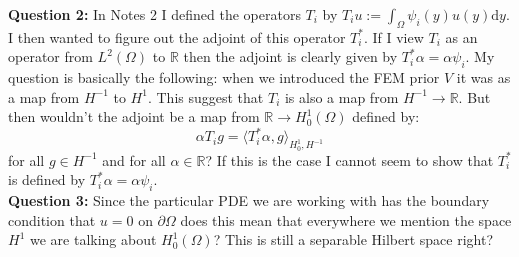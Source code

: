 \documentclass{article}
\theoremstyle{definition}
\theoremstyle{remark}
\begin{document}
\noindent \textbf{Question 2:} In Notes 2 I defined the operators $T_{i}$ by $T_{i}u:=\int_{\Omega}\psi_{i}(y)u(y)\mathrm{d}y$. I then wanted to figure out the adjoint of this operator $T_{i}^{*}$. If I view $T_{i}$ as an operator from $L^{2}(\Omega)$ to $\mathbb{R}$ then the adjoint is clearly given by $T_{i}^{*}\alpha=\alpha \psi_{i}$. My question is basically the following: when we introduced the FEM prior $V$ it was as a map from $H^{-1}$ to $H^{1}$. This suggest that $T_{i}$ is also a map from $H^{-1}\rightarrow\mathbb{R}$. But then wouldn't the adjoint be a map from $\mathbb{R}\rightarrow H_{0}^{1}(\Omega)$ defined by:
\begin{equation*}
    \alpha T_{i}g=\langle T_{i}^{*}\alpha, g \rangle_{H_{0}^{1},H^{-1}}
\end{equation*}
for all $g\in H^{-1}$ and for all $\alpha \in \mathbb{R}$? If this is the case I cannot seem to show that $T_{i}^{*}$ is defined by $T_{i}^{*}\alpha=\alpha \psi_{i}$. \\

\noindent \textbf{Question 3:} Since the particular PDE we are working with has the boundary condition that $u=0$ on $\partial\Omega$ does this mean that everywhere we mention the space $H^1$ we are talking about $H_{0}^{1}(\Omega)$? This is still a separable Hilbert space right?





\end{document}
